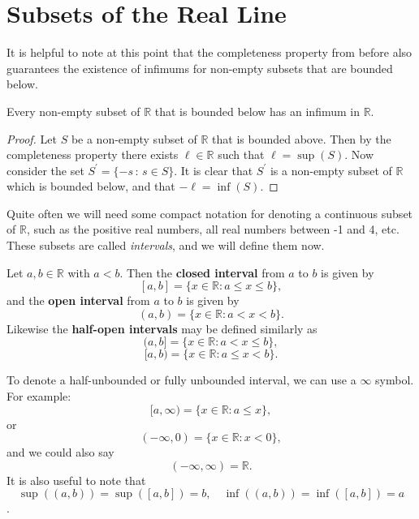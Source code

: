 \documentclass[../real_analysis.tex]{subfiles}
\begin{document}
    \section{Subsets of the Real Line}
        It is helpful to note at this point that the completeness property from before also guarantees the existence of infimums for non-empty subsets that are bounded below.
        \begin{theorem}
            Every non-empty subset of $\mathbb{R}$ that is bounded below has an infimum in $\mathbb{R}$.
        \end{theorem}
        \begin{proof}
            Let $S$ be a non-empty subset of $\mathbb{R}$ that is bounded above. Then by the completeness property there exists $\ell\in\mathbb{R}$ such that $\ell=\sup(S)$.
            Now consider the set $S^\prime=\{-s\,:\,s\in S\}$. It is clear that $S^\prime$ is a non-empty subset of $\mathbb{R}$ which is bounded below, and that $-\ell=\inf(S)$.
        \end{proof}
        Quite often we will need some compact notation for denoting a continuous subset of $\mathbb{R}$, such as the positive real numbers, all real numbers between -1 and 4, etc. These subsets are called \textit{intervals}, and we will define them now.
        \begin{definition}
            Let $a, b \in \mathbb{R}$ with $a<b$. Then the \textbf{closed interval} from $a$ to $b$ is given by
            \[[a, b] = \{x \in \mathbb{R} : a \leq x \leq b\},\]
            and the \textbf{open interval} from $a$ to $b$ is given by
            \[(a, b) = \{x \in \mathbb{R} : a < x < b\}.\]
            Likewise the \textbf{half-open intervals} may be defined similarly as
            \[(a, b] = \{x \in \mathbb{R} : a < x \leq b\},\]
            \[[a, b) = \{x \in \mathbb{R} : a \leq x < b\}.\]
        \end{definition}
        To denote a half-unbounded or fully unbounded interval, we can use a $\infty$ symbol. For example:
        \[[a, \infty) = \{x \in \mathbb{R} : a \leq x\},\]
        or
        \[(-\infty, 0) = \{x \in \mathbb{R} : x < 0\},\]
        and we could also say
        \[(-\infty, \infty) = \mathbb{R}.\]
        It is also useful to note that
        \[\sup((a, b))=\sup([a, b])=b,\quad\inf((a, b))=\inf([a, b])=a\].
\end{document}
